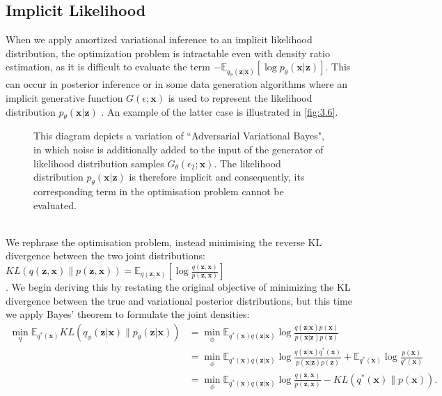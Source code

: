 \documentclass[honours,12pt]{unswthesis}
\newcommand{\E}{\mathbb{E}}
\numberwithin{equation}{section}
\theoremstyle{definition}
\begin{document}
\subsection{Implicit Likelihood}\label{sec:3.8.2}
When we apply amortized variational inference to an implicit likelihood distribution, the optimization problem is intractable even with density ratio estimation, as it is difficult to evaluate the term $-\E_{q_\phi(\bm{z}|\bm{x})}[\log p_\theta(\bm{x}|\bm{z})]$. This can occur in posterior inference or in some data generation algorithms where an implicit generative function $G(\epsilon;\bm{x})$ is used to represent the likelihood distribution $p_\theta(\bm{x}|\bm{z})$ \citep{ali}. An example of the latter case is illustrated in \autoref{fig:3.6}.
\begin{figure}[h]
  \centering
   \caption{\small This diagram depicts a variation of ``Adversarial Variational Bayes", in which noise is additionally added to the input of the generator of likelihood distribution samples $G_\theta(\epsilon_2;\bm{x})$. The likelihood distribution $p_\theta(\bm{x}|\bm{z})$ is therefore implicit and consequently, its corresponding term in the optimisation problem cannot be evaluated.}
   \label{fig:3.6}
\end{figure}\\
We rephrase the optimisation problem, instead minimising the reverse KL divergence between the two joint distributions: $KL(q(\bm{z},\bm{x})\|p(\bm{z},\bm{x}))=\E_{q(\bm{z},\bm{x})}\left[\log\frac{q(\bm{z},\bm{x})}{p(\bm{z},\bm{x})}\right]$\\\citep{tran}. We begin deriving this by restating the original objective of minimizing the KL divergence between the true and variational posterior distributions, but this time we apply Bayes' theorem to formulate the joint densities:
\begin{align*}
\min_q \mathbb{E}_{q^*(\bm{x})}KL(q_\phi(\bm{z}|\bm{x})\|p_\theta (\bm{z}|\bm{x}))&=\min_\phi\mathbb{E}_{q^*(\bm{x})q(\bm{z}|\bm{x})}\log \frac{q(\bm{z}|\bm{x})p(\bm{x})}{p(\bm{x}|\bm{z})p(\bm{z})}\\
&=\min_\phi\mathbb{E}_{q^*(\bm{x})q(\bm{z}|\bm{x})}\log \frac{q(\bm{z}|\bm{x})q^*(\bm{x})}{p(\bm{x}|\bm{z})p(\bm{z})}+\mathbb{E}_{q^*(\bm{x})}\log \frac{p(\bm{x})}{q^*(\bm{x})}\\
&= \min_\phi\mathbb{E}_{q^*(\bm{x})q(\bm{z}|\bm{x})}\log \frac{q(\bm{z},\bm{x})}{p(\bm{z},\bm{x})}-KL(q^*(\bm{x})\|p(\bm{x})).
\end{align*}
\end{document}

